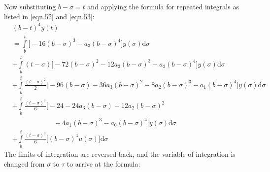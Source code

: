 \documentclass{article}
\begin{document}
Now substituting $b-\sigma = t$ and applying the formula for repeated integrals as listed in \eqref{eqn.52} and \eqref{eqn.53}:
\begin{equation}\label{eqn.70}
\begin{split}
	&(b-t)^{4}y(t)\\
	&=\int\limits_{b}^{t}\bigg[-16(b-\sigma)^{3} - a_3(b-\sigma)^{4}\bigg]y(\sigma)\mathrm{d}\sigma\\
	&+\int\limits_{b}^{t}(t-\sigma)\bigg[-72(b-\sigma)^{2} - 12a_3(b-\sigma)^{3} - a_2(b-\sigma)^{4}\bigg]y(\sigma)\mathrm{d}\sigma\\
	&+\int\limits_{b}^{t}\frac{(t-\sigma)^{2}}{2}\bigg[-96(b-\sigma)-36a_3(b-\sigma)^{2} - 8a_2(b-\sigma)^{3} - a_1(b-\sigma)^{4}\bigg]y(\sigma)\mathrm{d}\sigma\\
	&+\int\limits_{b}^{t}\frac{(t-\sigma)^{3}}{6}\bigg[-24-24a_3(b-\sigma)-12a_2(b-\sigma)^{2}
	\\&\qquad\qquad\qquad{}-4a_1(b-\sigma)^{3}-a_0(b-\sigma)^{4}\bigg]y(\sigma)\mathrm{d}\sigma\\
	&+\int\limits_{b}^{t}\frac{(t-\sigma)^{3}}{6}\bigg[(b-\sigma)^{4}u(\sigma)\bigg]\mathrm{d}\sigma
\end{split}
\end{equation}
The limits of integration are reversed back, and the variable of integration is changed from $\sigma$ to $\tau$ to arrive at the formula:
\end{document}
